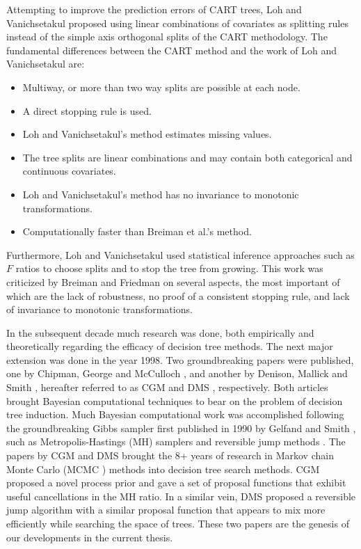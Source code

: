 Attempting to improve the prediction errors of CART trees, Loh and Vanichsetakul proposed using linear combinations of covariates as splitting rules instead of the simple axis orthogonal splits of the CART methodology. The fundamental differences between the CART method and the work of Loh and Vanichsetakul \cite{loh1988tree} are: 

\begin{itemize}
\item Multiway, or more than two way splits are possible at each node.
\item A direct stopping rule is used. 
\item Loh and Vanichsetakul's method estimates missing values. 
\item The tree splits are linear combinations and may contain both categorical and continuous covariates.
\item Loh and Vanichsetakul's method has no invariance to monotonic transformations.
\item Computationally faster than Breiman et al.'s method. 
\end{itemize}

Furthermore, Loh and Vanichsetakul used statistical inference approaches such as $F$ ratios to choose splits and to stop the tree from growing. This work was criticized by Breiman and Friedman  \cite{breiman1988comment} on several aspects, the most important of which are the lack of robustness, no proof of a consistent stopping rule, and lack of invariance to monotonic transformations. 

In the subsequent decade much research was done, both empirically and theoretically regarding the efficacy of decision tree methods. The next major extension was done in the year 1998. Two groundbreaking papers were published, one by Chipman, George and McCulloch \cite{chipman1998bayesian}, and another by Denison, Mallick and Smith \cite{denison1998bayesian}, hereafter referred to as CGM and DMS , respectively. Both articles brought Bayesian computational techniques to bear on the problem of decision tree induction. Much Bayesian computational work was accomplished following the groundbreaking Gibbs sampler first published in 1990 by Gelfand and Smith \cite{gelfand1990sampling}, such as Metropolis-Hastings (MH) samplers \cite{hastings1970monte,robert1999monte} and reversible jump methods \cite{green1995reversible}. The papers by CGM and DMS brought the 8+ years of research in Markov chain Monte Carlo (MCMC \hspace{-.1cm}) methods into decision tree search methods. CGM proposed a novel process prior and gave a set of proposal functions that exhibit useful cancellations in the MH ratio. In a similar vein, DMS proposed a reversible jump algorithm with a similar proposal function that appears to mix more efficiently while searching the space of trees. These two papers are the genesis of our developments in the current thesis. 

